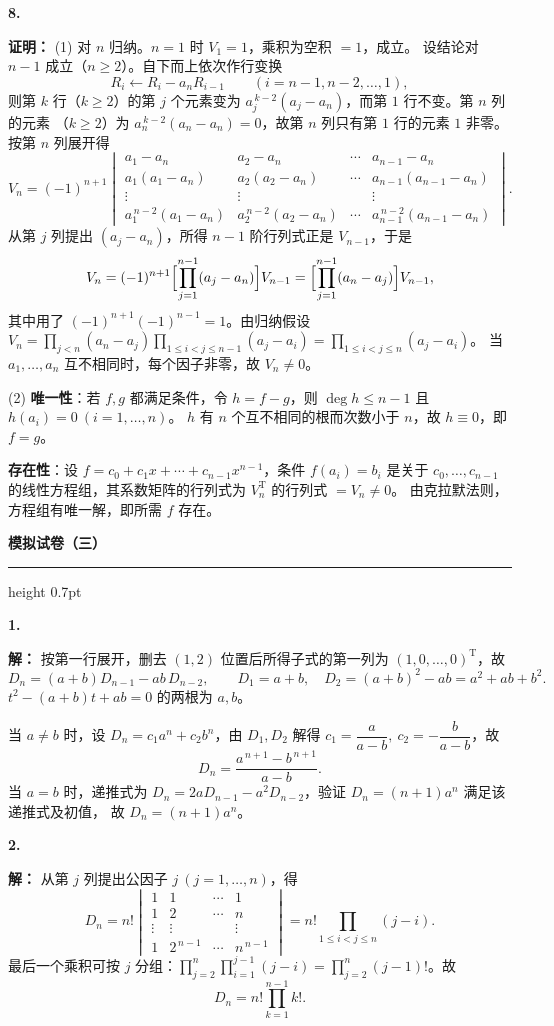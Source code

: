 \documentclass[11pt,a4paper,fontset=windows]{ctexart}
\newcommand{\paperhead}[1]{\Needspace{10\baselineskip}\par\vspace{16pt}%
  {\Large\bfseries\songti #1}\par\vspace{3pt}\hrule height 0.7pt\par\vspace{8pt}}
\newcommand{\sola}[2]{\Needspace{4\baselineskip}\par\vspace{10pt}%
  \noindent\textbf{#1}\hspace{0.45em}{\small\color{hdgray}\songti #2}\par\vspace{1pt}}
\newcommand{\pf}{\textbf{证明：}}
\newcommand{\sd}{\textbf{解：}}
\begin{document}
\sola{8.}{（15 分）}\pf
(1) 对 $n$ 归纳。$n=1$ 时 $V_1=1$，乘积为空积 $=1$，成立。
设结论对 $n-1$ 成立（$n\ge2$）。自下而上依次作行变换
\[
R_{i}\leftarrow R_{i}-a_nR_{i-1}\qquad(i=n-1,n-2,\dots,1),
\]
则第 $k$ 行（$k\ge2$）的第 $j$ 个元素变为 $a_j^{\,k-2}(a_j-a_n)$，而第 $1$ 行不变。第 $n$ 列的元素
（$k\ge2$）为 $a_n^{\,k-2}(a_n-a_n)=0$，故第 $n$ 列只有第 $1$ 行的元素 $1$ 非零。按第 $n$ 列展开得
\[
V_n=(-1)^{n+1}\begin{vmatrix}
a_1-a_n&a_2-a_n&\cdots&a_{n-1}-a_n\\
a_1(a_1-a_n)&a_2(a_2-a_n)&\cdots&a_{n-1}(a_{n-1}-a_n)\\
\vdots&\vdots&&\vdots\\
a_1^{\,n-2}(a_1-a_n)&a_2^{\,n-2}(a_2-a_n)&\cdots&a_{n-1}^{\,n-2}(a_{n-1}-a_n)
\end{vmatrix}.
\]
从第 $j$ 列提出 $(a_j-a_n)$，所得 $n-1$ 阶行列式正是 $V_{n-1}$，于是
\[
V_n=(-1)^{n+1}\Bigl[\prod_{j=1}^{n-1}(a_j-a_n)\Bigr]V_{n-1}
=\Bigl[\prod_{j=1}^{n-1}(a_n-a_j)\Bigr]V_{n-1},
\]
其中用了 $(-1)^{n+1}(-1)^{n-1}=1$。由归纳假设
$V_n=\prod_{j<n}(a_n-a_j)\prod_{1\le i<j\le n-1}(a_j-a_i)=\prod_{1\le i<j\le n}(a_j-a_i)$。
当 $a_1,\dots,a_n$ 互不相同时，每个因子非零，故 $V_n\neq0$。
\par
(2) \textbf{唯一性}：若 $f,g$ 都满足条件，令 $h=f-g$，则 $\deg h\le n-1$ 且 $h(a_i)=0\ (i=1,\dots,n)$。
$h$ 有 $n$ 个互不相同的根而次数小于 $n$，故 $h\equiv0$，即 $f=g$。
\par
\textbf{存在性}：设 $f=c_0+c_1x+\cdots+c_{n-1}x^{n-1}$，条件 $f(a_i)=b_i$ 是关于
$c_0,\dots,c_{n-1}$ 的线性方程组，其系数矩阵的行列式为 $V_n^{\mathrm T}$ 的行列式 $=V_n\neq0$。
由克拉默法则，方程组有唯一解，即所需 $f$ 存在。

\paperhead{模拟试卷（三）}

\sola{1.}{（10 分）}\sd
按第一行展开，删去 $(1,2)$ 位置后所得子式的第一列为 $(1,0,\dots,0)^{\mathrm T}$，故
\[
D_n=(a+b)D_{n-1}-ab\,D_{n-2},\qquad D_1=a+b,\quad D_2=(a+b)^{2}-ab=a^{2}+ab+b^{2}.
\]
$t^{2}-(a+b)t+ab=0$ 的两根为 $a,b$。
\par
当 $a\neq b$ 时，设 $D_n=c_1a^{n}+c_2b^{n}$，由 $D_1,D_2$ 解得
$c_1=\dfrac{a}{a-b},\ c_2=-\dfrac{b}{a-b}$，故
\[
D_n=\frac{a^{\,n+1}-b^{\,n+1}}{a-b}.
\]
当 $a=b$ 时，递推式为 $D_n=2aD_{n-1}-a^{2}D_{n-2}$，验证 $D_n=(n+1)a^{n}$ 满足该递推式及初值，
故 $D_n=(n+1)a^{n}$。

\sola{2.}{（10 分）}\sd
从第 $j$ 列提出公因子 $j\ (j=1,\dots,n)$，得
\[
D_n=n!\begin{vmatrix}
1&1&\cdots&1\\
1&2&\cdots&n\\
\vdots&\vdots&&\vdots\\
1&2^{\,n-1}&\cdots&n^{\,n-1}
\end{vmatrix}
=n!\prod_{1\le i<j\le n}(j-i).
\]
最后一个乘积可按 $j$ 分组：$\prod_{j=2}^{n}\prod_{i=1}^{j-1}(j-i)=\prod_{j=2}^{n}(j-1)!$。故
\[
D_n=n!\prod_{k=1}^{n-1}k! .
\]
\end{document}
